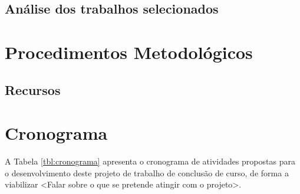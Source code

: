 \section{Análise dos trabalhos selecionados}

\chapter{Procedimentos Metodológicos}
\label{chap:metodologia}

\section{Recursos}

\chapter{Cronograma}
\label{chap:cronograma}

A Tabela \ref{tbl:cronograma} apresenta o cronograma de atividades propostas para o desenvolvimento deste projeto de trabalho de conclusão de curso, de forma a viabilizar <Falar sobre o que se pretende atingir com o projeto>.


